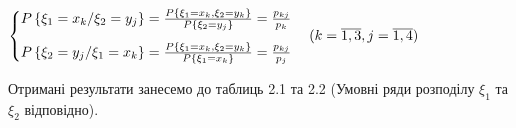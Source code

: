 \documentclass[a4paper, 20pt, titlepage]{article}
\begin{document}
\begin{spacing}{1.4}
\begin{center}
$
\displaystyle{
\begin{cases}
\vspace{3mm}
\cpo{x_k}{y_j} = \frac{P \left\{ \xi_1 = x_k, \xi_2 = y_k \right\} }{P\left\{\xi_2 = y_j \right\}} = \frac{p_{kj}}{p_k} \\
\cpt{y_j}{x_k} = \frac{P \left\{ \xi_1 = x_k, \xi_2 = y_k \right\} }{P\left\{\xi_1 = x_k \right\}} = \frac{p_{kj}}{p_j}
\end{cases}
(k = \overline{1,3}, j = \overline{1,4}})
$
\end{center}

Отримані результати занесемо до таблиць 2.1 та 2.2 (Умовні ряди розподілу $\xi_1$ та $\xi_2$ відповідно). 


\end{spacing}
\vspace{-3mm}
\end{document}
